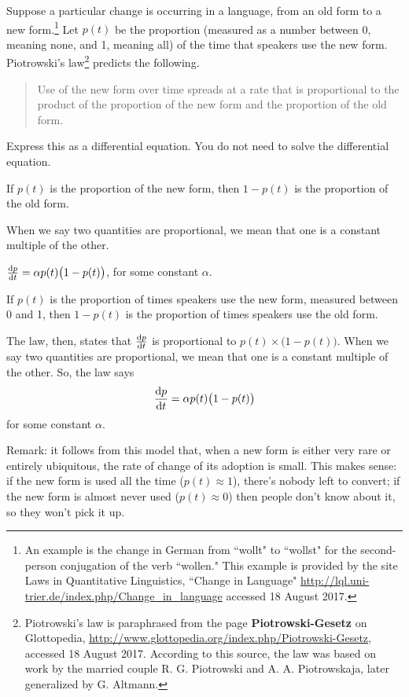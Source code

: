 \begin{Mquestion}
Suppose a particular change is occurring in a language, from an old form to a new form.\footnote{
An example is the change in German from ``wollt" to ``wollst" for the second-person conjugation of the verb ``wollen." This example
is provided by the site Laws in Quantitative Linguistics, ``Change in Language" \url{http://lql.uni-trier.de/index.php/Change_in_language} accessed 18 August 2017.
}
 Let $p(t)$ be the proportion (measured as a number between 0, meaning none, and 1, meaning all) of the time that speakers use the new form. Piotrowski's law\footnote{Piotrowski's law is paraphrased from the page \textbf{Piotrowski-Gesetz} on Glottopedia, \url{http://www.glottopedia.org/index.php/Piotrowski-Gesetz}, accessed 18 August 2017. According to this source, the law was based on work by the married couple R. G. Piotrowski and A. A. Piotrowskaja, later generalized by G. Altmann.
} predicts the following.
\begin{quote}\color{blue}
Use of the new form over time spreads at a rate that is proportional to the product of the proportion of the new form and the proportion of the old form.
\end{quote}

Express this as a differential equation. You do not need to solve the differential equation.
\end{Mquestion}
\begin{hint}
If $p(t)$ is the proportion of the new form, then $1-p(t)$ is the proportion of the old form.

When we say two quantities are proportional, we mean that one is a constant multiple of the other.
\end{hint}
\begin{answer}
$\diff{p}{t}=\alpha p(t)\big(1-p(t)\big)$, for some constant $\alpha$.
\end{answer}
\begin{solution}
If $p(t)$ is the proportion of times speakers use the new form, measured between 0 and 1, then $1-p(t)$ is the proportion of times speakers use the old form.

The law, then, states that $\diff{p}{t}$ is proportional to $p(t)\times \big(1-p(t)\big)$. When we say two quantities are proportional, we mean that one is a constant multiple of the other. So, the law says
\[\diff{p}{t}=\alpha p(t)\big(1-p(t)\big)\]
for some constant $\alpha$.

Remark: it follows from this model that, when a new form is either very rare or entirely ubiquitous, the rate of change of its adoption is small. This makes sense: if the new form is used all the time ($p(t)\approx 1$), there's nobody left to convert; if the new form is almost never used ($p(t)\approx 0$) then people don't know about it, so they won't pick it up.
\end{solution}
